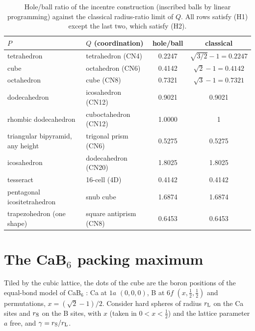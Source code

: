 \documentclass[11pt]{amsart}
\theoremstyle{definition}
\theoremstyle{remark}
\begin{document}
\begin{table}[t]
\caption{Hole/ball ratio of the incentre construction (inscribed balls by linear programming) against the classical radius-ratio limit of $Q$. All rows satisfy (H1) except the last two, which satisfy (H2).}
\label{tab:ratio}
\begin{tabular}{llcc}
\toprule
$P$ & $Q$ (coordination) & hole/ball & classical \\
\midrule
tetrahedron & tetrahedron (CN4) & 0.2247 & $\sqrt{3/2}-1=0.2247$\\
cube & octahedron (CN6) & 0.4142 & $\sqrt2-1=0.4142$\\
octahedron & cube (CN8) & 0.7321 & $\sqrt3-1=0.7321$\\
dodecahedron & icosahedron (CN12) & 0.9021 & 0.9021\\
rhombic dodecahedron & cuboctahedron (CN12) & 1.0000 & 1\\
triangular bipyramid, any height & trigonal prism (CN6) & 0.5275 & 0.5275\\
icosahedron & dodecahedron (CN20) & 1.8025 & 1.8025\\
tesseract & 16-cell (4D) & 0.4142 & 0.4142\\
\midrule
pentagonal icositetrahedron & snub cube & 1.6874 & 1.6874\\
trapezohedron (one shape) & square antiprism (CN8) & 0.6453 & 0.6453\\
\bottomrule
\end{tabular}
\end{table}

\section{The CaB$_6$ packing maximum}\label{sec:cab6}

Tiled by the cubic lattice, the dots of the cube are the boron positions of the equal-bond model of CaB$_6$ \cite{PaulingWeinbaum1934}: Ca at $1a$ $(0,0,0)$, B at $6f$ $(x,\tfrac12,\tfrac12)$ and permutations, $x=(\sqrt2-1)/2$. Consider hard spheres of radius $r_{\rm L}$ on the Ca sites and $r_{\rm S}$ on the B sites, with $x$ (taken in $0<x<\tfrac12$) and the lattice parameter $a$ free, and $\gamma=r_{\rm S}/r_{\rm L}$.
\end{document}
